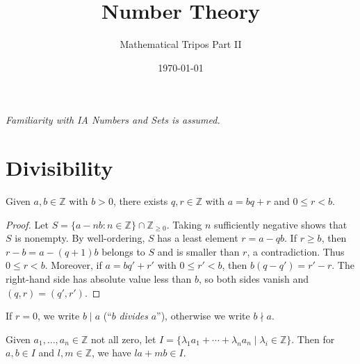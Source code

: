 \documentclass[a4paper, 10pt]{amsart}
\title{Number Theory}
\author{Mathematical Tripos Part II}
\date{\today}
\begin{document}
\maketitle



\begin{center}
\emph{Familiarity with IA Numbers and Sets is assumed.}
\end{center}

\section{Divisibility}



\begin{theorem}
    Given $a, b \in \mathbb{Z}$ with $b > 0$, there exists $q, r \in \mathbb{Z}$ with $a = bq + r$ and $0 \leq r < b$.
\end{theorem}
\begin{proof}
Let $S=\{a-nb:n\in\mathbb Z\}\cap\mathbb Z_{\geq0}$. Taking $n$ sufficiently negative shows that $S$ is nonempty. By well-ordering, $S$ has a least element $r=a-qb$. If $r\geq b$, then $r-b=a-(q+1)b$ belongs to $S$ and is smaller than $r$, a contradiction. Thus $0\leq r<b$. Moreover, if $a=bq'+r'$ with $0\leq r'<b$, then $b(q-q')=r'-r$. The right-hand side has absolute value less than $b$, so both sides vanish and $(q,r)=(q',r')$.
\end{proof}

\begin{definition}
  If $r = 0$, we write $b \mid a$ (``$b$ \emph{divides} $a$''), otherwise we write $b \nmid a$.
\end{definition}

Given $a_1, \dots, a_n \in \mathbb{Z}$ not all zero, let $I = \{\lambda_1 a_1 + \cdots + \lambda_n a_n \mid \lambda_i \in \mathbb{Z}\}$. Then for $a, b \in I$ and $l, m \in \mathbb{Z}$, we have $la + mb \in I$.
\end{document}
